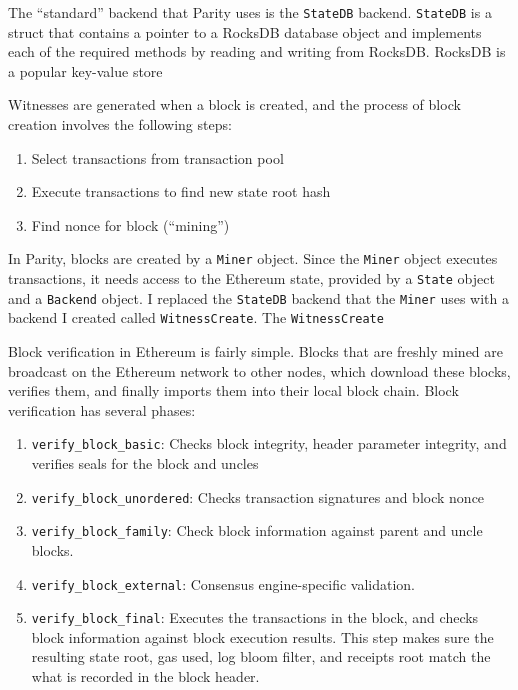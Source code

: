 \documentclass[12pt]{article}
\begin{document}
The ``standard'' backend that Parity uses is the \texttt{StateDB} backend. \texttt{StateDB} is a struct that contains a pointer to a RocksDB database object and implements each of the required methods by reading and writing from RocksDB. RocksDB is a popular key-value store


Witnesses are generated when a block is created, and the process of block creation involves the following steps:
\begin{enumerate}
  \item Select transactions from transaction pool
  \item Execute transactions to find new state root hash
  \item Find nonce for block (``mining'')
\end{enumerate}
In Parity, blocks are created by a \texttt{Miner} object. Since the \texttt{Miner} object executes transactions, it needs access to the Ethereum state, provided by a \texttt{State} object and a \texttt{Backend} object. I replaced the \texttt{StateDB} backend that the \texttt{Miner} uses with a backend I created called \texttt{WitnessCreate}. The \texttt{WitnessCreate}

Block verification in Ethereum is fairly simple. Blocks that are freshly mined are broadcast on the Ethereum network to other nodes, which download these blocks, verifies them, and finally imports them into their local block chain. Block verification has several phases:
\begin{enumerate}
  \item \texttt{verify\_block\_basic}: Checks block integrity, header parameter integrity, and verifies seals for the block and uncles
  \item \texttt{verify\_block\_unordered}: Checks transaction signatures and block nonce
  \item \texttt{verify\_block\_family}: Check block information against parent and uncle blocks.
  \item \texttt{verify\_block\_external}: Consensus engine-specific validation.
  \item \texttt{verify\_block\_final}: Executes the transactions in the block, and checks block information against block execution results. This step makes sure the resulting state root, gas used, log bloom filter, and receipts root match the what is recorded in the block header.
\end{enumerate}
\end{document}
